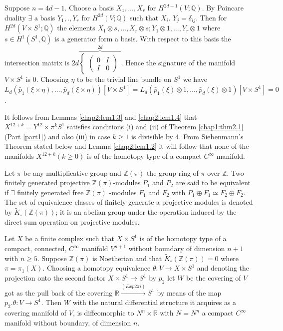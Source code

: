  Suppose $n = 4d - 1$. Choose a basis $X_1, \ldots, X_r$ for $ H^{2d
   -1}(V; \mathbb{Q})$. By Poincare duality $\exists$ a basis $Y_1,
 . , Y_r$ for $ H^{2d}(V ; \mathbb{Q})$ such that $X_i$.  $Y_j =
 \delta_{ij}$. Then for  $H^{2d} (V \times S^1 ; \mathbb{Q})$ the
 elements $X_1 \otimes s, \ldots, X_r \otimes s ; Y_1 \otimes 1,
 \ldots, Y_r \otimes 1$ where $s \in H^1 (S^1, \mathbb{Q})$
 is a generator form a basis. With respect to this basis the
 intersection matrix is
 $2d \overbrace{
\begin{cases}
 \left( \begin{smallmatrix} 
0 & I\\
I & 0 
\end{smallmatrix}
\right)
 \end{cases}}^{2d}$. Hence the signature of the
 manifold $V \times S^1$ is 0. Choosing $ \eta$ to be the trivial line
 bundle on $S^1$ we have $L_d (\bar{p}_1 (\xi \times \eta ), \ldots,
 \bar{p}_d ( \xi \times \eta)) [ V \times S^1] = L_d (\bar{p}_1 (\xi)
 \otimes 1, \ldots, \bar{p}_d (\xi ) \otimes 1) [ V \times S^1] = 0$. 

It follows from Lemmas \ref{chap2:lem1.3} and \ref{chap2:lem1.4} that
$ X^{12 +k} = Y^{12} \times 
\pi^{k} S^1$ satisfies conditions (i) and (ii) of Theorem
\ref{chap1:thm2.1} (Part \ref{part1})
and also (iii) in case $ k \geq 1$ is divisible by 
4. From Siebenmann's Theorem stated below and Lemma  \ref{chap2:lem1.2} it will
follow that none of the manifolds $X^{12+k} (k \geq 0)$ is of the
homotopy type of a compact $ C^\infty$ manifold. 

Let $\pi$ be any multiplicative group and $\mathbb{Z} (\pi)$ the group
ring of $\pi$ over $\mathbb{Z}$. Two finitely generated projective
$\mathbb{Z} (\pi)$-modules $P_1$ and $P_2$ are said to be equivalent
if $\exists$ finitely generated free $\mathbb{Z} (\pi)$
-modules\pageoriginale 
$F_1$ and $F_2$ with $P_1 \oplus  F_1 \simeq F_2 \oplus F_2$. The set
of equivalence classes of finitely generate a projective modules is
denoted by $\tilde{K}_\circ (\mathbb{Z} (\pi))$; it is an abelian group under
the operation induced by the direct sum operation on projective
modules.  

\setcounter{theorem}{4}
\begin{theorem}[Siebenmann]\label{chap2:thm1.5} %
 Let $X$ be a finite complex such that $X \times S^1$ is
  of the homotopy type of a compact, connected, $C^\infty$ manifold $V^{n+1}$
  without boundary of dimension $n+1$ with $ n \geq 5$. Suppose
  $\mathbb{Z} (\pi)$ is Noetherian and that $\tilde{K}_\circ
  (\mathbb{Z}(\pi)) = 0$ where $\pi =  \pi_1 (X)$. Choosing a homotopy 
  equivalence $\theta : V \to X \times S^1$ and denoting the
  projection onto the second factor $X \times S^1 \to S^1$ by $p_2$
  let $W$ be the covering of $V$ got as the pull back of the covering
  $\mathbb{R} \xrightarrow{(Exp 2 \pi i)} S^1$ by means of the map
  $p_2 . \theta : V \to S^1$. Then $W$ with the natural
  differential structure it acquires as a covering manifold of $V$, is
  diffeomorphic to $N^n \times  \mathbb{R}$ with $ N = N^n$ a compact
  $C^\infty$ manifold without boundary, of dimension $n$. 
\end{theorem}

